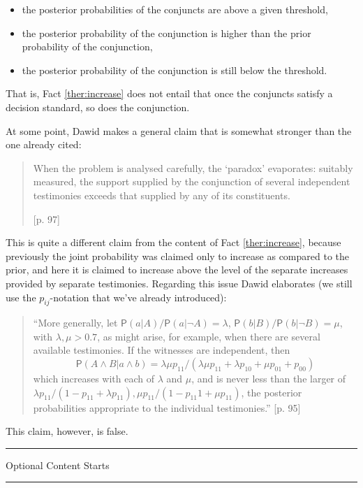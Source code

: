\documentclass[
  10pt,
  dvipsnames,enabledeprecatedfontcommands]{scrartcl}
\newcommand{\n}{\neg}
\newcommand{\et}{\wedge}
\newcommand{\pr}[1]{\mathsf{P}(#1)}
\newcommand{\intermezzoa}{
	\begin{minipage}[c]{13cm}
	\begin{center}\rule{10cm}{0.4pt}



	\tiny{\sc Optional Content Starts}
	
	\vspace{-1mm}
	
	\rule{10cm}{0.4pt}\end{center}
	\end{minipage}\nopagebreak 
	}
\begin{document}
\begin{itemize}
\item  the posterior probabilities of the conjuncts are above a given threshold,
\item   the posterior probability of the conjunction is higher than the prior probability of the conjunction,
\item   the posterior probability of the conjunction 
 is still below the threshold.
\end{itemize}

That is, Fact \ref{ther:increase} does not entail that once the
conjuncts satisfy a decision standard, so does the conjunction.

At some point, Dawid makes a general claim that is somewhat stronger
than the one already cited:

\begin{quote} When the problem is analysed carefully, the `paradox' evaporates: suitably measured, the support supplied by the conjunction of several independent testimonies exceeds that supplied by any of its constituents.

  [p. 97]\end{quote}

This is quite a different claim from the content of Fact
\ref{ther:increase}, because previously the joint probability was
claimed only to increase as compared to the prior, and here it is
claimed to increase above the level of the separate increases provided
by separate testimonies. Regarding this issue Dawid elaborates (we still
use the \(p_{ij}\)-notation that we've already introduced):

\begin{quote}
 ``More generally, let $\pr{a\vert A}/\pr{a\vert \n A}=\lambda$, $\pr{b\vert B}/\pr{b\vert \n B}=\mu$, with $\lambda, \mu >0.7$, as might arise, for example, when there are several available testimonies. If the witnesses are
  independent, then \[\pr{A\et B\vert  a\et b} = \lambda \mu p_{11}/(\lambda \mu p_{11} + \lambda p_{10} +\mu p_{01} + p_{00})\] which  increases with
 each of $\lambda$ and $\mu$, and is never less than the larger of $\lambda p_{11}/(1-p_{11}+\lambda p_{11}),
 \mu p_{11} /(1- p_{11} 1 + \mu p_{11})$, the posterior probabilities appropriate to the individual testimonies.'' [p. 95]
 \end{quote}

This claim, however, is false.

\intermezzoa
\end{document}
